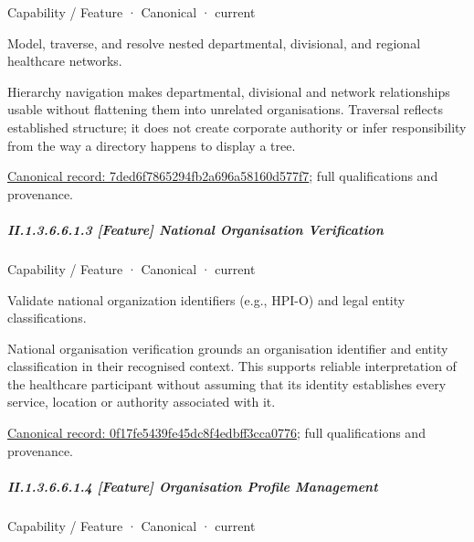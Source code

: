 \label{element:7ded6f7865294fb2a696a58160d577f7}
{\small Capability / Feature · Canonical · current}\par

Model, traverse, and resolve nested departmental, divisional, and regional healthcare networks.



Hierarchy navigation makes departmental, divisional and network relationships usable without flattening them into unrelated organisations. Traversal reflects established structure; it does not create corporate authority or infer responsibility from the way a directory happens to display a tree.


{\footnotesize \href{../../../../continuum/strategy/capability/feature/7ded6f7865294fb2a696a58160d577f7.md}{Canonical record: 7ded6f7865294fb2a696a58160d577f7}; full qualifications and provenance.}\par
\subparagraph*{II.1.3.6.6.1.3 [Feature] National Organisation Verification}
\label{navigation:II.1.3.6.6.1.3}

\label{element:0f17fe5439fe45dc8f4edbff3cca0776}
{\small Capability / Feature · Canonical · current}\par

Validate national organization identifiers (e.g., HPI-O) and legal entity classifications.



National organisation verification grounds an organisation identifier and entity classification in their recognised context. This supports reliable interpretation of the healthcare participant without assuming that its identity establishes every service, location or authority associated with it.


{\footnotesize \href{../../../../continuum/strategy/capability/feature/0f17fe5439fe45dc8f4edbff3cca0776.md}{Canonical record: 0f17fe5439fe45dc8f4edbff3cca0776}; full qualifications and provenance.}\par
\subparagraph*{II.1.3.6.6.1.4 [Feature] Organisation Profile Management}
\label{navigation:II.1.3.6.6.1.4}

\label{element:6a4c44cfb1414f3bae5ba0fce1e58970}
{\small Capability / Feature · Canonical · current}\par

